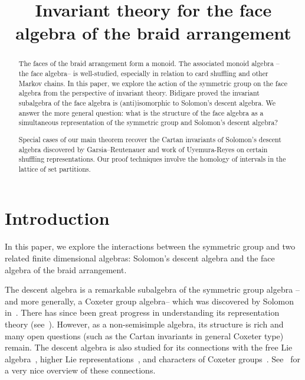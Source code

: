 \documentclass[ALCO, Unicode]{cedram}
\title{Invariant theory for the face algebra of the braid arrangement}
\author[\initial{P.} \lastname{Commins}]{\firstname{Patricia}  \lastname{Commins}}
\begin{document}
\begin{abstract}
{The faces of the braid arrangement form a monoid. The associated monoid algebra -- the face algebra-- is well-studied, especially in relation to card shuffling and other Markov chains. In this paper, we explore the action of the symmetric group on the face algebra from the perspective of invariant theory. Bidigare proved the invariant subalgebra of the face algebra is (anti)isomorphic to Solomon's descent algebra. We answer the more general question: what is the structure of the face algebra as a simultaneous representation of the symmetric group and Solomon's descent algebra?

Special cases of our main theorem recover the Cartan invariants of Solomon's descent algebra discovered by Garsia--Reutenauer and work of Uyemura-Reyes on certain shuffling representations. Our proof techniques involve the homology of intervals in the lattice of set partitions.}
\end{abstract}


\maketitle


\section{Introduction}
In this paper, we explore the interactions between the symmetric group and two related finite dimensional algebras: Solomon's descent algebra and the face algebra of the braid arrangement.

The descent algebra is a remarkable subalgebra of the symmetric group algebra -- and more generally, a Coxeter group algebra-- which was discovered by Solomon in~\cite{Solomondescentbirth}. There has since been great progress in understanding its representation theory (see~\cite{atkinson,Bergerons-hyper1, Bergerons-general, Bergerons-hyper2, blessonlaue, bonnafepfeiffer, garsia-reutenauer, pfeiffer2009quiver, saliolaloewytypeD, saliolaquiverdescalgebra, Schocker}). However, as a non-semisimple algebra, its structure is rich and many open questions (such as the Cartan invariants in general Coxeter type) remain. The descent algebra is also studied for its connections with the free Lie algebra~\cite{garsia-reutenauer, reutenauer}, higher Lie representations~\cite{schocker2003multiplicities, Uyemura-Reyes}, and characters of Coxeter groups~\cite{blesshohlshock, jollenbeckreutenauer, Solomondescentbirth}. See~\cite{SchockerSurvey} for a very nice overview of these connections.
\end{document}

